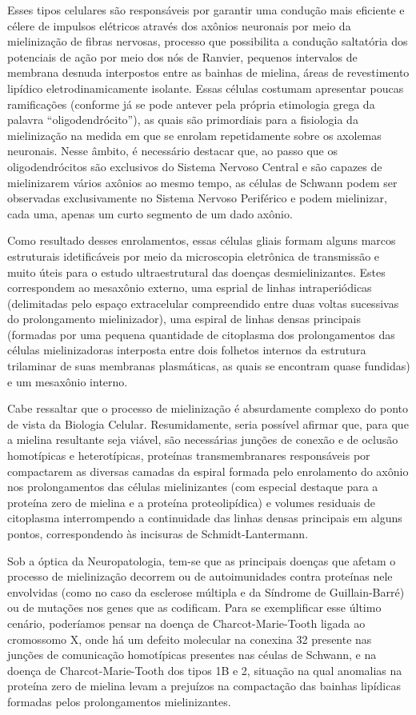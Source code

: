 \documentclass[
]{book}
\theoremstyle{definition}
\theoremstyle{definition}
\theoremstyle{definition}
\theoremstyle{definition}
\theoremstyle{remark}
\begin{document}
Esses tipos celulares são responsáveis por garantir uma condução mais eficiente e célere de impulsos elétricos através dos axônios neuronais por meio da mielinização de fibras nervosas, processo que possibilita a condução saltatória dos potenciais de ação por meio dos nós de Ranvier, pequenos intervalos de membrana desnuda interpostos entre as bainhas de mielina, áreas de revestimento lipídico eletrodinamicamente isolante. Essas células costumam apresentar poucas ramificações (conforme já se pode antever pela própria etimologia grega da palavra ``oligodendrócito''), as quais são primordiais para a fisiologia da mielinização na medida em que se enrolam repetidamente sobre os axolemas neuronais. Nesse âmbito, é necessário destacar que, ao passo que os oligodendrócitos são exclusivos do Sistema Nervoso Central e são capazes de mielinizarem vários axônios ao mesmo tempo, as células de Schwann podem ser observadas exclusivamente no Sistema Nervoso Periférico e podem mielinizar, cada uma, apenas um curto segmento de um dado axônio.

Como resultado desses enrolamentos, essas células gliais formam alguns marcos estruturais idetificáveis por meio da microscopia eletrônica de transmissão e muito úteis para o estudo ultraestrutural das doenças desmielinizantes. Estes correspondem ao mesaxônio externo, uma esprial de linhas intraperiódicas (delimitadas pelo espaço extracelular compreendido entre duas voltas sucessivas do prolongamento mielinizador), uma espiral de linhas densas principais (formadas por uma pequena quantidade de citoplasma dos prolongamentos das células mielinizadoras interposta entre dois folhetos internos da estrutura trilaminar de suas membranas plasmáticas, as quais se encontram quase fundidas) e um mesaxônio interno.

Cabe ressaltar que o processo de mielinização é absurdamente complexo do ponto de vista da Biologia Celular. Resumidamente, seria possível afirmar que, para que a mielina resultante seja viável, são necessárias junções de conexão e de oclusão homotípicas e heterotípicas, proteínas transmembranares responsáveis por compactarem as diversas camadas da espiral formada pelo enrolamento do axônio nos prolongamentos das células mielinizantes (com especial destaque para a proteína zero de mielina e a proteína proteolipídica) e volumes residuais de citoplasma interrompendo a continuidade das linhas densas principais em alguns pontos, correspondendo às incisuras de Schmidt-Lantermann.

Sob a óptica da Neuropatologia, tem-se que as principais doenças que afetam o processo de mielinização decorrem ou de autoimunidades contra proteínas nele envolvidas (como no caso da esclerose múltipla e da Síndrome de Guillain-Barré) ou de mutações nos genes que as codificam. Para se exemplificar esse último cenário, poderíamos pensar na doença de Charcot-Marie-Tooth ligada ao cromossomo X, onde há um defeito molecular na conexina 32 presente nas junções de comunicação homotípicas presentes nas céulas de Schwann, e na doença de Charcot-Marie-Tooth dos tipos 1B e 2, situação na qual anomalias na proteína zero de mielina levam a prejuízos na compactação das bainhas lipídicas formadas pelos prolongamentos mielinizantes.
\end{document}
